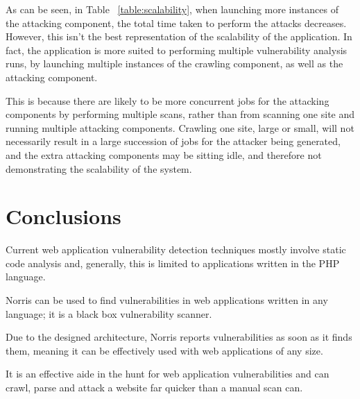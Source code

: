 \documentclass[12pt,a4paper]{article}
\begin{document}
As can be seen, in Table ~\ref{table:scalability}, when launching more instances of the attacking component, the total time taken to perform the attacks decreases.  However, this isn't the best representation of the scalability of the application.  In fact, the application is more suited to performing multiple vulnerability analysis runs, by launching multiple instances of the crawling component, as well as the attacking component.  

This is because there are likely to be more concurrent jobs for the attacking components by performing multiple scans, rather than from scanning one site and running multiple attacking components.  Crawling one site, large or small, will not necessarily result in a large succession of jobs for the attacker being generated, and the extra attacking components may be sitting idle, and therefore not demonstrating the scalability of the system.


\section{Conclusions}

Current web application vulnerability detection techniques mostly involve static code analysis and, generally, this is limited to applications written in the PHP language.

Norris can be used to find vulnerabilities in web applications written in any language; it is a black box vulnerability scanner. 

Due to the designed architecture, Norris reports vulnerabilities as soon as it finds them, meaning it can be effectively used with web applications of any size.

It is an effective aide in the hunt for web application vulnerabilities and can crawl, parse and attack a website far quicker than a manual scan can.


\end{document}
